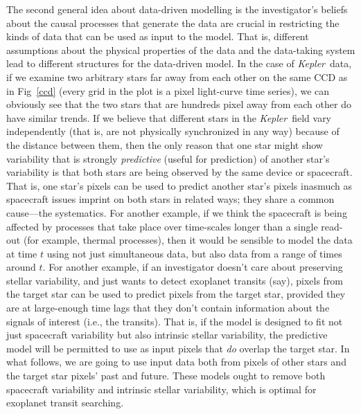 \documentclass[12pt, preprint]{aastex}
\newcommand{\project}[1]{\textsl{#1}}
\newcommand{\Kepler}{\project{Kepler}}
\begin{document}
The second general idea about data-driven modelling is the investigator's beliefs
  about the causal processes that generate the data
  are crucial in restricting the kinds of data that can be used as input to the model.
That is, different assumptions about the physical properties of the data
  and the data-taking system
  lead to different structures for the data-driven model.
In the case of \Kepler\ data, 
  if we examine two arbitrary stars far away from each other 
  on the same CCD as in Fig~\ref{ccd} (every grid in the plot is a pixel light-curve time series), 
  we can obviously see that the two stars that are hundreds pixel away from each other do have similar trends. 
  If we believe that different stars in the \Kepler\ field vary independently 
  (that is, are not physically synchronized in any way) because of the distance between them, 
  then the only reason that one star might show variability that is strongly \emph{predictive} (useful for prediction) of another star's variability
  is that both stars are being observed by the same device or spacecraft.
That is, one star's pixels can be used to predict another star's pixels
  inasmuch as spacecraft issues imprint on both stars in related ways;
  they share a common cause---the systematics.  
For another example, if we think the spacecraft is being affected by
  processes that take place over time-scales longer than a single read-out
  (for example, thermal processes),
  then it would be sensible to model the data at time $t$ using not just simultaneous data, but also data from a range of times around $t$.
For another example, if an investigator doesn't care about preserving stellar variability,
  and just wants to detect exoplanet transits (say),
  pixels from the target star can be used to predict pixels from the target star,
  provided they are at large-enough time lags that they don't contain information about
  the signals of interest (i.e., the transits).
That is, if the model is designed to fit not just spacecraft variability
  but also intrinsic stellar variability,
  the predictive model will be permitted to use as input pixels that \emph{do} overlap the 
  target star.
In what follows, we are going to use input data both from pixels of other stars and the  
target star pixels' past and future.
These models ought to remove both spacecraft variability and intrinsic stellar variability, 
which is optimal for exoplanet transit searching.
\end{document}
